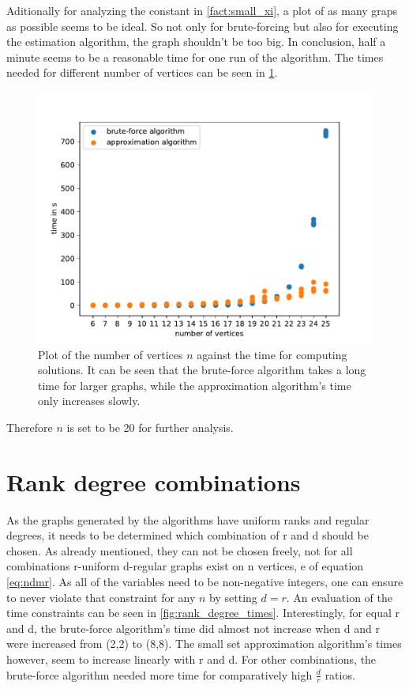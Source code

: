 Aditionally for analyzing the constant in \cref{fact:small_xi}, a plot of as many graps as possible seems to be ideal. So not only for brute-forcing but also for executing the estimation algorithm, the graph shouldn't be too big. In conclusion, half a minute seems to be a reasonable time for one run of the algorithm. %
The times needed for different number of vertices can be seen in \cref{fig:no_vertices_time}.
\begin{figure}[htpb]
	\centering
	\includegraphics[scale=0.8]{figures/number_vertices_all_logs.pdf}
	\caption[Plot graph size vs time]{Plot of the number of vertices $n$ against the time for computing solutions. It can be seen that the brute-force algorithm takes a long time for larger graphs, while the approximation algorithm's time only increases slowly.\label{fig:no_vertices_time}}
\end{figure}

Therefore $n$ is set to be 20 for further analysis.
\section{Rank degree combinations}

As the graphs generated by the algorithms have uniform ranks and regular degrees, it needs to be determined which combination of r and d should be chosen. As already mentioned, they can not be chosen freely, not for all combinations r-uniform d-regular graphs exist on n vertices, e of equation \cref{eq:ndmr}. 
As all of the variables need to be non-negative integers, one can ensure to never violate that constraint for any $n$ by setting $d=r$. An evaluation of the time constraints can be seen in \cref{fig:rank_degree_times}. Interestingly, for equal r and d, the brute-force algorithm's time did almost not increase when d and r were increased from (2,2) to (8,8). The small set approximation algorithm's times however, seem to increase linearly with r and d. For other combinations, the brute-force algorithm needed more time for comparatively high $\frac{d	}{r}$ ratios.

